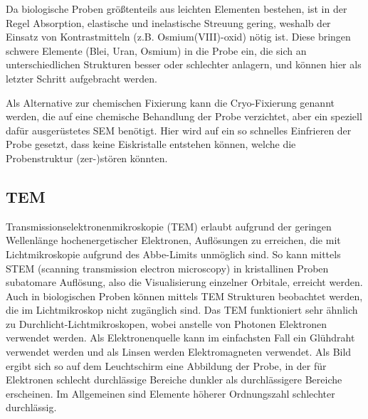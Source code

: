 Da biologische Proben größtenteils aus leichten Elementen bestehen, ist in der Regel Absorption, elastische und inelastische Streuung gering, weshalb der Einsatz von Kontrastmitteln (z.B. Osmium(VIII)-oxid) nötig ist.
Diese bringen schwere Elemente (Blei, Uran, Osmium) in die Probe ein, die sich an unterschiedlichen Strukturen besser oder schlechter anlagern, und können hier als letzter Schritt aufgebracht werden.

Als Alternative zur chemischen Fixierung kann die Cryo-Fixierung genannt werden, die auf eine chemische Behandlung der Probe verzichtet, aber ein speziell dafür ausgerüstetes SEM benötigt.
Hier wird auf ein so schnelles Einfrieren der Probe gesetzt, dass keine Eiskristalle entstehen können, welche die Probenstruktur (zer-)stören könnten.





\subsection{TEM}

Transmissionselektronenmikroskopie (TEM) erlaubt aufgrund der geringen Wellenlänge hochenergetischer Elektronen, Auflösungen zu erreichen, die mit Lichtmikroskopie aufgrund des Abbe-Limits unmöglich sind.
So kann mittels STEM (scanning transmission electron microscopy) in kristallinen Proben subatomare Auflösung, also die Visualisierung einzelner Orbitale, erreicht werden.
Auch in biologischen Proben können mittels TEM Strukturen beobachtet werden, die im Lichtmikroskop nicht zugänglich sind.
Das TEM funktioniert sehr ähnlich zu Durchlicht-Lichtmikroskopen, wobei anstelle von Photonen Elektronen verwendet werden.
Als Elektronenquelle kann im einfachsten Fall ein Glühdraht verwendet werden und als Linsen werden Elektromagneten verwendet.
Als Bild ergibt sich so auf dem Leuchtschirm eine Abbildung der Probe, in der für Elektronen schlecht durchlässige Bereiche dunkler als durchlässigere Bereiche erscheinen.
Im Allgemeinen sind Elemente höherer Ordnungszahl schlechter durchlässig.

